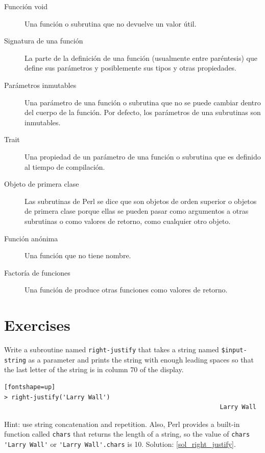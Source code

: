 \begin{description}
\item[Funcción void] Una función o subrutina que no devuelve
un valor útil.

\item[Signatura de una función] La parte de la definición de 
una función (usualmente entre paréntesis) que define 
sus parámetros y posiblemente sus tipos y otras propiedades.

\item[Parámetros inmutables] Una parámetro de una función
o subrutina que no se puede cambiar dentro del cuerpo de
la función. Por defecto, los parámetros de una
subrutinas son inmutables.

\item[Trait] Una propiedad de un parámetro de una función
o subrutina que es definido al tiempo de compilación.

\item[Objeto de primera clase] Las subrutinas de Perl se
dice que son objetos de orden superior o objetos de primera 
clase porque ellas se pueden pasar como argumentos a 
otras subrutinas o como valores de retorno, como cualquier
otro objeto.

\item[Función anónima] Una función que no tiene nombre.

\item[Factoría de funciones] Una función de produce otras 
funciones como valores de retorno.

\end{description}


\section{Exercises}

\begin{exercise}
\label{right_justify}

Write a subroutine named \verb"right-justify" that takes a string
named {\tt \$input-string} as a parameter and prints the 
string with enough leading spaces so that the last letter 
of the string is in column 70 of the display.

\begin{verbatim}[fontshape=up]
> right-justify('Larry Wall')
                                                           Larry Wall
\end{verbatim}

Hint: use string concatenation and repetition.  Also,
Perl provides a built-in function called {\tt chars} that
returns the length of a string, so the value of 
\verb"chars 'Larry Wall'" or \verb"'Larry Wall'.chars" is 10.
Solution: \ref{sol_right_justify}.

\end{exercise}


